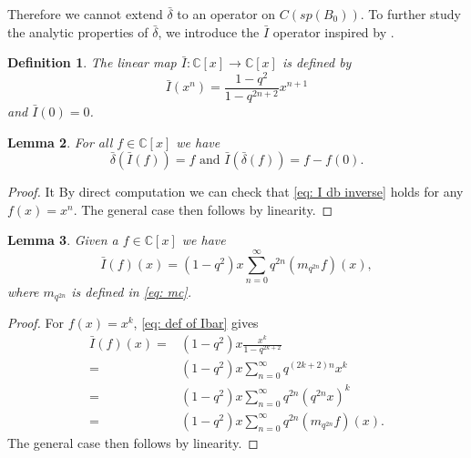 \documentclass[12pt]{article}
\newtheorem{definition}{Definition}[section]
\newtheorem{lemma}[definition]{Lemma}
\numberwithin{equation}{section}
\def\db{\bar{\delta}}
\def\C{{\mathbb C}}
\def\I{\bar{I}}
\begin{document}
Therefore we cannot extend $\db$ to an operator on $C(sp(B_0))$. To further study the analytic properties of $\db$, we introduce the 
  $\I$ operator inspired by \cite[Equation (1.15.7)]{koekoek2010hypergeometric}.

\begin{definition}\label{def: Ibar operator}
  The linear map $\I: \C[x]\to \C[x]$  is defined  by 
  \begin{equation}\label{eq: def of Ibar}
\bar{I}(x^n)=\frac{1-q^2}{1-q^{2n+2}}x^{n+1}
\end{equation}
and $\bar{I}(0)=0$.
\end{definition}

\begin{lemma}\label{lemma: I db inverse}
For all $f \in \C[x]$ we have 
\begin{equation}\label{eq: I db inverse}
\db(\I(f)) = f \text{ and }\I(\db(f)) = f-f(0).
\end{equation}
\end{lemma}
\begin{proof} It By direct computation we can check that \eqref{eq: I db inverse} holds for any $f(x)=x^n$. The general case then follows by linearity.
\end{proof}

\begin{lemma}\label{lemma: expansion of I}
    Given a $f \in \C[x]$ we have  \begin{equation}\label{eq: expansion of I}
    \I(f)(x) = (1-q^2)x \sum_{n=0}^{\infty} q^{2n}(m_{q^{2n}}f)(x),
    \end{equation}
    where $m_{q^{2n}}$ is defined in \eqref{eq: mc}.
\end{lemma}
\begin{proof}
   For $f(x)=x^k$, \eqref{eq: def of Ibar} gives
   \begin{equation*}
   \begin{split}
   \I(f)(x)=&(1-q^2)x\frac{x^k}{1-q^{2k+2}}\\
   =&(1-q^2)x\sum_{n=0}^{\infty}q^{(2k+2)n}x^k\\
   =&(1-q^2)x\sum_{n=0}^{\infty} q^{2n}(q^{2n}x)^k\\
   =&(1-q^2)x\sum_{n=0}^{\infty}q^{2n}(m_{q^{2n}}f)(x).
   \end{split}
   \end{equation*}
   The general case then follows by linearity.
\end{proof}
\end{document}
